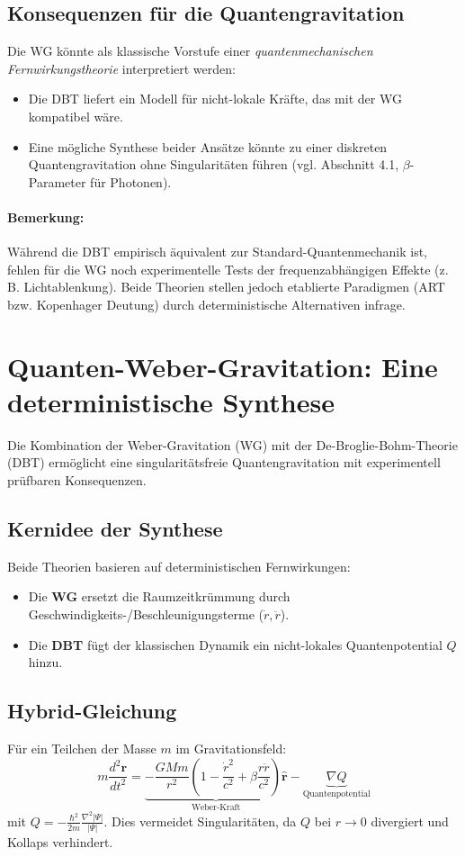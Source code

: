 \subsection{Konsequenzen für die Quantengravitation}
Die WG könnte als klassische Vorstufe einer \textit{quantenmechanischen Fernwirkungstheorie} interpretiert werden:
\begin{itemize}
    \item Die DBT liefert ein Modell für nicht-lokale Kräfte, das mit der WG kompatibel wäre.
    \item Eine mögliche Synthese beider Ansätze könnte zu einer diskreten Quantengravitation ohne Singularitäten führen (vgl. Abschnitt 4.1, $\beta$-Parameter für Photonen).
\end{itemize}

\paragraph*{Bemerkung:} Während die DBT empirisch äquivalent zur Standard-Quantenmechanik ist, fehlen für die WG noch experimentelle Tests der frequenzabhängigen Effekte (z. B. Lichtablenkung). Beide Theorien stellen jedoch etablierte Paradigmen (ART bzw. Kopenhager Deutung) durch deterministische Alternativen infrage.

\newpage
\section{Quanten-Weber-Gravitation: Eine deterministische Synthese}
Die Kombination der Weber-Gravitation (WG) mit der De-Broglie-Bohm-Theorie (DBT) ermöglicht eine singularitätsfreie Quantengravitation mit experimentell prüfbaren Konsequenzen.

\subsection{Kernidee der Synthese}
Beide Theorien basieren auf deterministischen Fernwirkungen:
\begin{itemize}
    \item Die \textbf{WG} ersetzt die Raumzeitkrümmung durch Geschwindigkeits-/Beschleunigungsterme ($\dot{r}, \ddot{r}$).
    \item Die \textbf{DBT} fügt der klassischen Dynamik ein nicht-lokales Quantenpotential $Q$ hinzu.
\end{itemize}

\subsection{Hybrid-Gleichung}
Für ein Teilchen der Masse $m$ im Gravitationsfeld:
\begin{equation}
    m\frac{d^2\mathbf{r}}{dt^2} = \underbrace{-\frac{GMm}{r^2}\left(1-\frac{\dot{r}^2}{c^2}+\beta\frac{r\ddot{r}}{c^2}\right)\hat{\mathbf{r}}}_{\text{Weber-Kraft}} - \underbrace{\nabla Q}_{\text{Quantenpotential}}
\end{equation}
mit $Q = -\frac{\hbar^2}{2m}\frac{\nabla^2|\Psi|}{|\Psi|}$. Dies vermeidet Singularitäten, da $Q$ bei $r \to 0$ divergiert und Kollaps verhindert.

